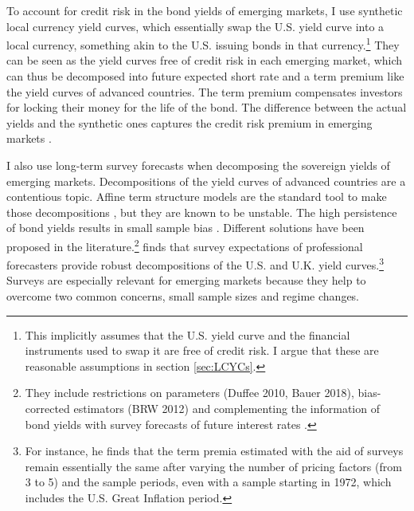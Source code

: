 {%
To account for credit risk in the bond yields of emerging markets, I use synthetic local currency yield curves, which essentially swap the U.S. yield curve into a local currency,
something akin to the U.S. issuing bonds in that currency.\footnote{ This implicitly assumes that the U.S. yield curve and the financial instruments used to swap it are free of credit risk. I argue that these are reasonable assumptions in section \ref{sec:LCYCs}.}
They can be seen as the yield curves free of credit risk in each emerging market, which can thus be decomposed into 
future expected short rate and a term premium like the yield curves of advanced countries. 
The term premium compensates investors for locking their money for the life of the bond.
The difference between the actual yields and the synthetic ones captures the credit risk premium in emerging markets \citep{DuSchreger:2016JoF}.

I also use long-term survey forecasts when decomposing the sovereign yields of emerging markets.
Decompositions of the yield curves of advanced countries are a contentious topic.
Affine term structure models are the standard tool to make those decompositions \citep{CochranePiazzesi:2008}, but they are known to be unstable.
The high persistence of bond yields results in small sample bias \citep{KimOrphanides:2012}.
Different solutions have been proposed in the literature.\footnote{ They include restrictions on parameters (Duffee 2010, Bauer 2018), bias-corrected estimators (BRW 2012) and complementing the information of bond yields with survey forecasts of future interest rates \citep{KimWright:2005,KimOrphanides:2012}.} 
\cite{Guimaraes:2014} finds that survey expectations of professional forecasters provide robust decompositions of the U.S. and U.K. yield curves.\footnote{ For instance, he finds that the term premia estimated with the aid of surveys remain essentially the same after varying the number of pricing factors (from 3 to 5) and the sample periods, even with a sample starting in 1972, which includes the U.S. Great Inflation period.} 
Surveys are especially relevant for emerging markets because they help to overcome two common concerns, small sample sizes and regime changes.

}
